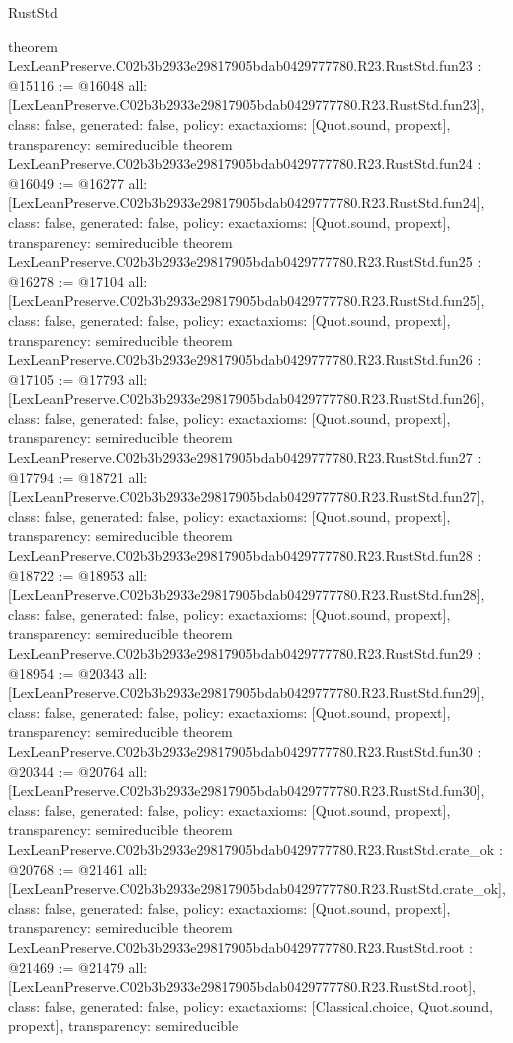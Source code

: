\begin{lexlean}{RustStd}
\begin{coremodule}
{}
theorem LexLeanPreserve.C02b3b2933e29817905bdab0429777780.R23.RustStd.fun23 : @15116 := @16048 {
  all: [LexLeanPreserve.C02b3b2933e29817905bdab0429777780.R23.RustStd.fun23],
  class: false,
  generated: false,
  policy: exact{axioms: [Quot.sound, propext]},
  transparency: semireducible
}
theorem LexLeanPreserve.C02b3b2933e29817905bdab0429777780.R23.RustStd.fun24 : @16049 := @16277 {
  all: [LexLeanPreserve.C02b3b2933e29817905bdab0429777780.R23.RustStd.fun24],
  class: false,
  generated: false,
  policy: exact{axioms: [Quot.sound, propext]},
  transparency: semireducible
}
theorem LexLeanPreserve.C02b3b2933e29817905bdab0429777780.R23.RustStd.fun25 : @16278 := @17104 {
  all: [LexLeanPreserve.C02b3b2933e29817905bdab0429777780.R23.RustStd.fun25],
  class: false,
  generated: false,
  policy: exact{axioms: [Quot.sound, propext]},
  transparency: semireducible
}
theorem LexLeanPreserve.C02b3b2933e29817905bdab0429777780.R23.RustStd.fun26 : @17105 := @17793 {
  all: [LexLeanPreserve.C02b3b2933e29817905bdab0429777780.R23.RustStd.fun26],
  class: false,
  generated: false,
  policy: exact{axioms: [Quot.sound, propext]},
  transparency: semireducible
}
theorem LexLeanPreserve.C02b3b2933e29817905bdab0429777780.R23.RustStd.fun27 : @17794 := @18721 {
  all: [LexLeanPreserve.C02b3b2933e29817905bdab0429777780.R23.RustStd.fun27],
  class: false,
  generated: false,
  policy: exact{axioms: [Quot.sound, propext]},
  transparency: semireducible
}
theorem LexLeanPreserve.C02b3b2933e29817905bdab0429777780.R23.RustStd.fun28 : @18722 := @18953 {
  all: [LexLeanPreserve.C02b3b2933e29817905bdab0429777780.R23.RustStd.fun28],
  class: false,
  generated: false,
  policy: exact{axioms: [Quot.sound, propext]},
  transparency: semireducible
}
theorem LexLeanPreserve.C02b3b2933e29817905bdab0429777780.R23.RustStd.fun29 : @18954 := @20343 {
  all: [LexLeanPreserve.C02b3b2933e29817905bdab0429777780.R23.RustStd.fun29],
  class: false,
  generated: false,
  policy: exact{axioms: [Quot.sound, propext]},
  transparency: semireducible
}
theorem LexLeanPreserve.C02b3b2933e29817905bdab0429777780.R23.RustStd.fun30 : @20344 := @20764 {
  all: [LexLeanPreserve.C02b3b2933e29817905bdab0429777780.R23.RustStd.fun30],
  class: false,
  generated: false,
  policy: exact{axioms: [Quot.sound, propext]},
  transparency: semireducible
}
theorem LexLeanPreserve.C02b3b2933e29817905bdab0429777780.R23.RustStd.crate_ok : @20768 := @21461 {
  all: [LexLeanPreserve.C02b3b2933e29817905bdab0429777780.R23.RustStd.crate_ok],
  class: false,
  generated: false,
  policy: exact{axioms: [Quot.sound, propext]},
  transparency: semireducible
}
theorem LexLeanPreserve.C02b3b2933e29817905bdab0429777780.R23.RustStd.root : @21469 := @21479 {
  all: [LexLeanPreserve.C02b3b2933e29817905bdab0429777780.R23.RustStd.root],
  class: false,
  generated: false,
  policy: exact{axioms: [Classical.choice, Quot.sound, propext]},
  transparency: semireducible
}


\end{coremodule}
\end{lexlean}
